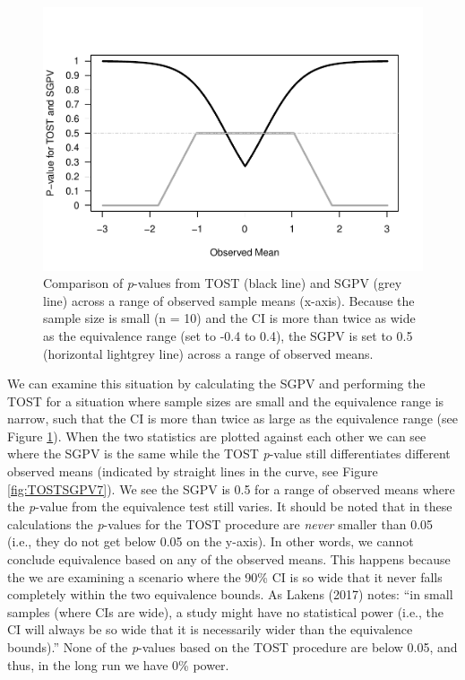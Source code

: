 \documentclass[,man,floatsintext]{apa6}
\begin{document}
\begin{figure}
\centering
\includegraphics{manuscript.R2_files/figure-latex/TOSTSGPV6-1.pdf}
\caption{\label{fig:TOSTSGPV6}Comparison of \emph{p}-values from TOST (black line) and SGPV (grey line) across a range of observed sample means (x-axis). Because the sample size is small (n = 10) and the CI is more than twice as wide as the equivalence range (set to -0.4 to 0.4), the SGPV is set to 0.5 (horizontal lightgrey line) across a range of observed means.}
\end{figure}

We can examine this situation by calculating the SGPV and performing the TOST for a situation where sample sizes are small and the equivalence range is narrow, such that the CI is more than twice as large as the equivalence range (see Figure \ref{fig:TOSTSGPV6}). When the two statistics are plotted against each other we can see where the SGPV is the same while the TOST \emph{p}-value still differentiates different observed means (indicated by straight lines in the curve, see Figure \ref{fig:TOSTSGPV7}). We see the SGPV is 0.5 for a range of observed means where the \emph{p}-value from the equivalence test still varies. It should be noted that in these calculations the \emph{p}-values for the TOST procedure are \emph{never} smaller than 0.05 (i.e., they do not get below 0.05 on the y-axis). In other words, we cannot conclude equivalence based on any of the observed means. This happens because the we are examining a scenario where the 90\% CI is so wide that it never falls completely within the two equivalence bounds. As Lakens (2017) notes: \enquote{in small samples (where CIs are wide), a study might have no statistical power (i.e., the CI will always be so wide that it is necessarily wider than the equivalence bounds).} None of the \emph{p}-values based on the TOST procedure are below 0.05, and thus, in the long run we have 0\% power.
\end{document}
